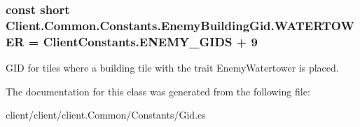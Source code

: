 \subsubsection[{W\+A\+T\+E\+R\+T\+O\+W\+E\+R}]{\setlength{\rightskip}{0pt plus 5cm}const short Client.\+Common.\+Constants.\+Enemy\+Building\+Gid.\+W\+A\+T\+E\+R\+T\+O\+W\+E\+R = {\bf Client\+Constants.\+E\+N\+E\+M\+Y\+\_\+\+G\+I\+D\+S} + 9}\label{classClient_1_1Common_1_1Constants_1_1EnemyBuildingGid_ac4142a0f5f5a5050245fe8d066989917}


G\+I\+D for tiles where a building tile with the trait Enemy\+Watertower is placed. 



The documentation for this class was generated from the following file\+:\begin{DoxyCompactItemize}
\item 
client/client/client.\+Common/\+Constants/Gid.\+cs\end{DoxyCompactItemize}
